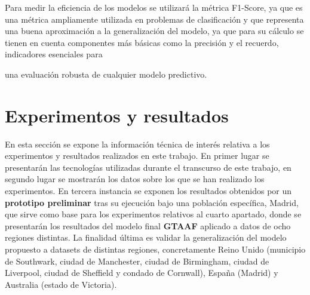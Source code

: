 \documentclass{uathesis-es}
\begin{document}
	Para medir la eficiencia de los modelos se utilizará la métrica F1-Score, ya que es una métrica ampliamente utilizada en problemas de clasificación y que representa una buena aproximación a la generalización del modelo, ya que para su cálculo se tienen en cuenta componentes más básicas como la precisión y el recuerdo, indicadores esenciales para {una evaluación robusta de cualquier modelo predictivo.
		
		
		\chapter{Experimentos y resultados}
		
		En esta sección se expone la información técnica de interés relativa a los experimentos y resultados realizados en este trabajo. En primer lugar se presentarán las tecnologías utilizadas durante el transcurso de este trabajo, en segundo lugar se mostrarán los datos sobre los que se han realizado los experimentos. En tercera instancia se exponen los resultados obtenidos por un \textbf{prototipo preliminar} tras su ejecución bajo una población específica, Madrid, que sirve como base para los experimentos relativos al cuarto apartado, donde se presentarán los resultados del modelo final \textbf{GTAAF} aplicado a datos de ocho regiones distintas. La finalidad última es validar la generalización del modelo propuesto a datasets de distintas regiones, concretamente Reino Unido (municipio de Southwark, ciudad de Manchester, ciudad de Birmingham, ciudad de Liverpool, ciudad de Sheffield y condado de Cornwall), España (Madrid) y Australia (estado de Victoria).
		
		
		
		
		
		
}
\end{document}
